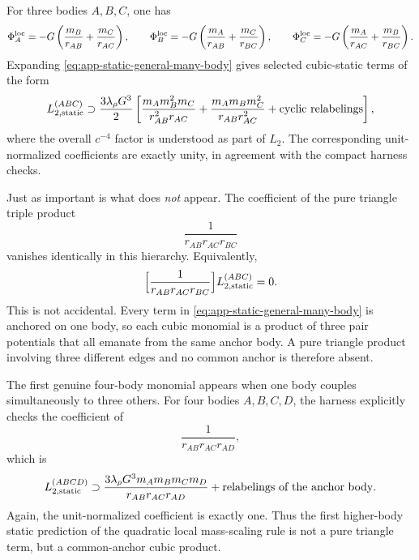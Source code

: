 \documentclass[11pt]{article}
\begin{document}
For three bodies \(A,B,C\), one has
\begin{equation}
\Phi_A^{\rm loc}=-G\left(\frac{m_B}{r_{AB}}+\frac{m_C}{r_{AC}}\right),
\qquad
\Phi_B^{\rm loc}=-G\left(\frac{m_A}{r_{AB}}+\frac{m_C}{r_{BC}}\right),
\qquad
\Phi_C^{\rm loc}=-G\left(\frac{m_A}{r_{AC}}+\frac{m_B}{r_{BC}}\right).
\label{eq:app-static-three-body-phi}
\end{equation}
Expanding \cref{eq:app-static-general-many-body} gives selected cubic-static terms of the
form
\begin{equation}
L_{2,\rm static}^{(ABC)}\supset
\frac{3\lambda_\rho G^3}{2}
\left[
\frac{m_A m_B^2 m_C}{r_{AB}^2 r_{AC}}
+\frac{m_A m_B m_C^2}{r_{AB}r_{AC}^2}
+\text{cyclic relabelings}
\right],
\label{eq:app-static-three-body-selected}
\end{equation}
where the overall \(c^{-4}\) factor is understood as part of \(L_2\).
The corresponding unit-normalized coefficients are exactly unity, in agreement with the
compact harness checks.

Just as important is what does \emph{not} appear.  The coefficient of the pure triangle
triple product
\begin{equation}
\frac{1}{r_{AB}r_{AC}r_{BC}}
\label{eq:app-static-pure-triangle}
\end{equation}
vanishes identically in this hierarchy.  Equivalently,
\begin{equation}
\Bigl[\frac{1}{r_{AB}r_{AC}r_{BC}}\Bigr]L_{2,\rm static}^{(ABC)}=0.
\label{eq:app-static-pure-triangle-zero}
\end{equation}
This is not accidental.  Every term in
\cref{eq:app-static-general-many-body} is anchored on one body, so each cubic monomial is
a product of three pair potentials that all emanate from the same anchor body.  A pure
triangle product involving three different edges and no common anchor is therefore absent.

The first genuine four-body monomial appears when one body couples simultaneously to three
others.  For four bodies \(A,B,C,D\), the harness explicitly checks the coefficient of
\begin{equation}
\frac{1}{r_{AB}r_{AC}r_{AD}},
\label{eq:app-static-four-body-monomial}
\end{equation}
which is
\begin{equation}
L_{2,\rm static}^{(ABCD)}\supset
\frac{3\lambda_\rho G^3 m_A m_B m_C m_D}{r_{AB}r_{AC}r_{AD}}
+\text{relabelings of the anchor body}.
\label{eq:app-static-four-body-selected}
\end{equation}
Again, the unit-normalized coefficient is exactly one.  Thus the first higher-body static
prediction of the quadratic local mass-scaling rule is not a pure triangle term, but a
common-anchor cubic product.
\end{document}
